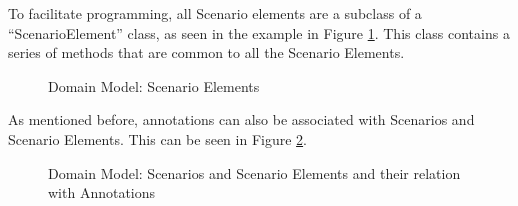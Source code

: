 To facilitate programming, all Scenario elements are a subclass of a ``ScenarioElement'' class, as seen in the example in Figure \ref{figure:domainModel3}. This class contains a series of methods that are common to all the Scenario Elements.

\begin{figure}
\centering
\renewcommand {\umltextcolor}{black}
\renewcommand {\umlfillcolor}{none}
\renewcommand {\umldrawcolor}{black}

\caption{Domain Model: Scenario Elements}
\label{figure:domainModel3}
\end{figure}

As mentioned before, annotations can also be associated with Scenarios and Scenario Elements. This can be seen in Figure \ref{figure:domainModel4}.

\begin{figure}
\centering
\renewcommand {\umltextcolor}{black}
\renewcommand {\umlfillcolor}{none}
\renewcommand {\umldrawcolor}{black}

\caption{Domain Model: Scenarios and Scenario Elements and their relation with Annotations}
\label{figure:domainModel4}
\end{figure}

